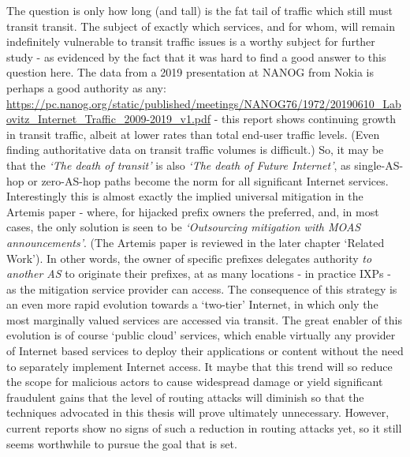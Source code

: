 The question is only how long (and tall) is the fat tail of traffic which still must transit transit.
The subject of exactly which services, and for whom, will remain indefinitely vulnerable to transit traffic issues is a worthy subject for further study - as evidenced by the fact that it was hard to find a good answer to this question here.
The data from a 2019 presentation at NANOG from Nokia is perhaps a good authority as any: \url{https://pc.nanog.org/static/published/meetings/NANOG76/1972/20190610\_Labovitz\_Internet\_Traffic\_2009-2019\_v1.pdf} - this report shows continuing growth in transit traffic, albeit at lower rates than total end-user traffic levels.
(Even finding authoritative data on transit traffic volumes is difficult.)
So, it may be that the \emph{‘The death of transit’} is also \emph{‘The death of Future Internet’}, as single-AS-hop or zero-AS-hop paths become the norm for all significant Internet services.
Interestingly this is almost exactly the implied universal mitigation in the Artemis
paper - where, for hijacked prefix owners the preferred, and, in most cases,
the only solution is seen to be \emph{`Outsourcing mitigation with MOAS announcements'}.  (The Artemis paper is reviewed in the later chapter `Related Work').
In other words, the owner of specific prefixes delegates authority \emph{to another AS} to originate their prefixes, at as many locations - in practice IXPs - as the mitigation service provider can access.
The consequence of this strategy is an even more rapid evolution towards a `two-tier' Internet, in which only the most marginally valued services are accessed via transit.
The great enabler of this evolution is of course `public cloud' services, which enable virtually any provider of Internet based services to deploy their applications or content without the need to separately implement Internet access.
It maybe that this trend will so reduce the scope for malicious actors to cause widespread damage or yield significant fraudulent gains that the level of routing attacks will diminish so that the techniques advocated in this thesis will prove ultimately unnecessary.
However, current reports show no signs of such a reduction in routing attacks yet, so it still seems worthwhile to pursue the goal that is set.

